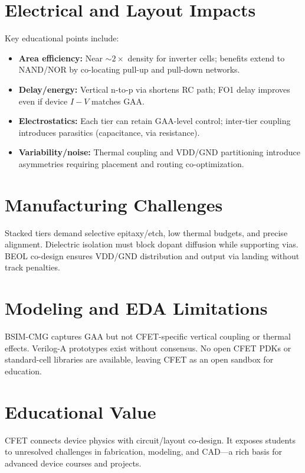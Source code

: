 \documentclass[conference]{IEEEtran}
\begin{document}
\section{Electrical and Layout Impacts}
Key educational points include:
\begin{itemize}
  \item \textbf{Area efficiency:} Near $\sim 2\times$ density for inverter cells; benefits extend to NAND/NOR by co-locating pull-up and pull-down networks.
  \item \textbf{Delay/energy:} Vertical n-to-p via shortens RC path; FO1 delay improves even if device $I\!-\!V$ matches GAA.
  \item \textbf{Electrostatics:} Each tier can retain GAA-level control; inter-tier coupling introduces parasitics (capacitance, via resistance).
  \item \textbf{Variability/noise:} Thermal coupling and VDD/GND partitioning introduce asymmetries requiring placement and routing co-optimization.
\end{itemize}

\section{Manufacturing Challenges}
Stacked tiers demand selective epitaxy/etch, low thermal budgets, and precise alignment.
Dielectric isolation must block dopant diffusion while supporting vias.
BEOL co-design ensures VDD/GND distribution and output via landing without track penalties.

\section{Modeling and EDA Limitations}
BSIM-CMG captures GAA but not CFET-specific vertical coupling or thermal effects.
Verilog-A prototypes exist without consensus.
No open CFET PDKs or standard-cell libraries are available, leaving CFET as an open sandbox for education.\nocite{*}

\section{Educational Value}
CFET connects device physics with circuit/layout co-design.
It exposes students to unresolved challenges in fabrication, modeling, and CAD---a rich basis for advanced device courses and projects.
\end{document}
